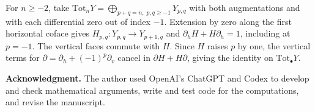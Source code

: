 \documentclass[11pt]{article}
\theoremstyle{definition}
\theoremstyle{remark}
\begin{document}
For $n\geq-2$, take $\mathrm{Tot}_n Y=\bigoplus_{p+q=n,\;p,q\geq-1}Y_{p,q}$ with
both augmentations and with each differential zero out of index $-1$.
Extension by zero along the first horizontal coface gives
$H_{p,q}:Y_{p,q}\to Y_{p+1,q}$ and
$\partial_hH+H\partial_h=1$, including at $p=-1$.
The vertical faces commute with $H$. Since $H$ raises $p$ by one, the
vertical terms for $\partial=\partial_h+(-1)^p\partial_v$ cancel in
$\partial H+H\partial$, giving the identity on $\mathrm{Tot}_\bullet Y$.



\medskip
\noindent\textbf{Acknowledgment.}
The author used OpenAI's ChatGPT and Codex to develop and check
mathematical arguments, write and test code for the computations,
and revise the manuscript.

\small
{}


\end{document}
